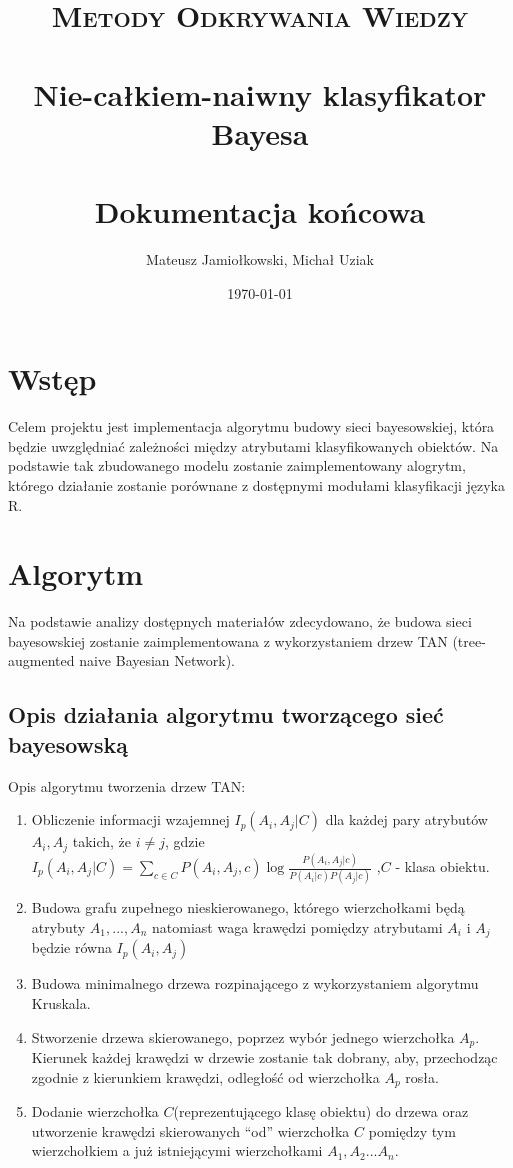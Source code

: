 \documentclass[paper=a4, fontsize=11pt]{scrartcl} %
\title{	
\normalfont \normalsize 
\textsc{Metody Odkrywania Wiedzy} \\ [25pt] %
\horrule{0.5pt} \\[0.4cm] %
\huge Nie-całkiem-naiwny klasyfikator Bayesa \\ %
\horrule{2pt} \\[0.5cm] %
\LARGE Dokumentacja końcowa
}%
\author{Mateusz Jamiołkowski, Michał Uziak} %
\date{\normalsize\today} %
\numberwithin{equation}{section} %
\numberwithin{figure}{section} %
\numberwithin{table}{section} %
\begin{document}
\maketitle %

\newpage

\tableofcontents

\newpage

\section{Wstęp}

Celem projektu jest implementacja algorytmu budowy sieci bayesowskiej, która będzie uwzględniać zależności między atrybutami klasyfikowanych obiektów. Na podstawie tak zbudowanego modelu zostanie zaimplementowany alogrytm, którego działanie zostanie porównane z dostępnymi modułami klasyfikacji języka R.

\section{Algorytm}
Na podstawie analizy dostępnych materiałów zdecydowano, że budowa sieci bayesowskiej zostanie zaimplementowana z wykorzystaniem drzew TAN (tree-augmented naive Bayesian Network). 

\subsection{Opis działania algorytmu tworzącego sieć bayesowską}
\label{ref:bayesAlgorithmDescription}


Opis algorytmu tworzenia drzew TAN:
\begin{enumerate}
 \item Obliczenie informacji wzajemnej $I_p(A_i,A_j|C)$ dla każdej pary atrybutów $A_i, A_j$ takich, że $i\neq j $, gdzie 
 $I_p(A_i,A_j|C)= \sum_{c \in C}^{} {P(A_i,A_j,c) \log\frac{P(A_i,A_j|c)}{P(A_i|c)P(A_j|c)} } $ ,$C$ - klasa obiektu.
 
 \item  Budowa grafu zupełnego nieskierowanego, którego wierzchołkami będą atrybuty $A_1,... ,A_n$ natomiast waga krawędzi pomiędzy atrybutami $A_i$ i $A_j$ 		będzie równa $I_p(A_i,A_j)$
 
 \item  Budowa minimalnego drzewa rozpinającego z wykorzystaniem algorytmu Kruskala.
 \item  Stworzenie drzewa skierowanego, poprzez wybór jednego wierzchołka $A_p$. Kierunek każdej krawędzi w drzewie zostanie tak dobrany, aby, przechodząc zgodnie z kierunkiem krawędzi, odległość od wierzchołka $A_p$ rosła. \label{ref:buildDirectedTreeAlgorithm}
 \item Dodanie wierzchołka $C$(reprezentującego klasę obiektu) do drzewa oraz utworzenie krawędzi skierowanych “od” wierzchołka $C$ pomiędzy tym wierzchołkiem a już istniejącymi wierzchołkami $A_1,A_2...A_n$.
 
\end{enumerate}
\end{document}
